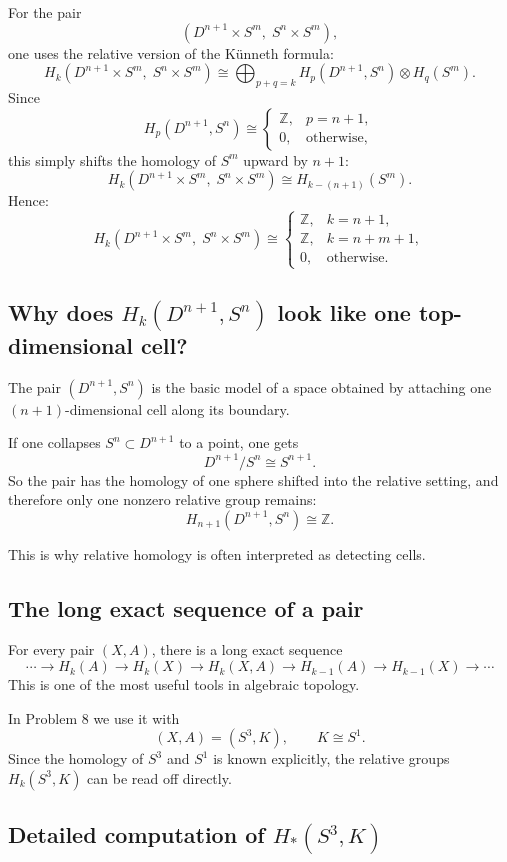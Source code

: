 \documentclass[12pt,a4paper]{article}
\theoremstyle{notespace}
\begin{document}
For the pair
\[
(D^{n+1}\times S^m,\; S^n\times S^m),
\]
one uses the relative version of the K\"unneth formula:
\[
H_k(D^{n+1}\times S^m,\; S^n\times S^m)
\cong
\bigoplus_{p+q=k} H_p(D^{n+1},S^n)\otimes H_q(S^m).
\]
Since
\[
H_p(D^{n+1},S^n)\cong
\begin{cases}
	\mathbb Z, & p=n+1,\\
	0, & \text{otherwise},
\end{cases}
\]
this simply shifts the homology of \(S^m\) upward by \(n+1\):
\[
H_k(D^{n+1}\times S^m,\; S^n\times S^m)\cong H_{k-(n+1)}(S^m).
\]
Hence:
\[
H_k(D^{n+1}\times S^m,\; S^n\times S^m)\cong
\begin{cases}
	\mathbb Z, & k=n+1,\\
	\mathbb Z, & k=n+m+1,\\
	0, & \text{otherwise}.
\end{cases}
\]

\subsection{Why does \(H_k(D^{n+1},S^n)\) look like one top-dimensional cell?}

The pair \((D^{n+1},S^n)\) is the basic model of a space obtained by attaching one \((n+1)\)-dimensional cell along its boundary.

If one collapses \(S^n\subset D^{n+1}\) to a point, one gets
\[
D^{n+1}/S^n \cong S^{n+1}.
\]
So the pair has the homology of one sphere shifted into the relative setting, and therefore only one nonzero relative group remains:
\[
H_{n+1}(D^{n+1},S^n)\cong \mathbb Z.
\]

This is why relative homology is often interpreted as detecting cells.

\subsection{The long exact sequence of a pair}

For every pair \((X,A)\), there is a long exact sequence
\[
\cdots \to H_k(A)\to H_k(X)\to H_k(X,A)\to H_{k-1}(A)\to H_{k-1}(X)\to \cdots
\]
This is one of the most useful tools in algebraic topology.

In Problem 8 we use it with
\[
(X,A)=(S^3,K),
\qquad K\cong S^1.
\]
Since the homology of \(S^3\) and \(S^1\) is known explicitly, the relative groups \(H_k(S^3,K)\) can be read off directly.

\subsection{Detailed computation of \(H_*(S^3,K)\)}
\end{document}
